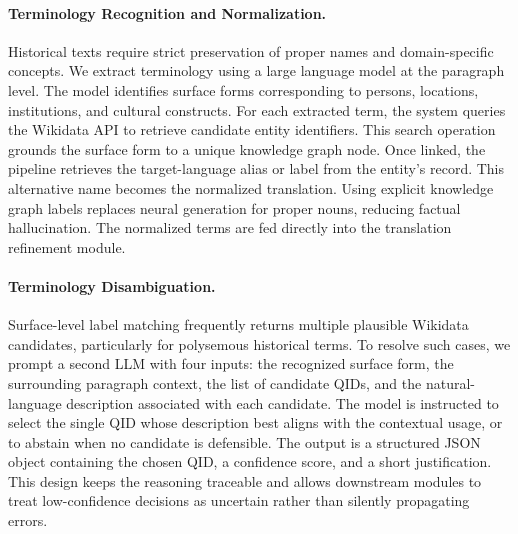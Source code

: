 \documentclass[11pt]{article}
\begin{document}




\paragraph{Terminology Recognition and Normalization.}
Historical texts require strict preservation of proper names and domain-specific concepts. We extract terminology using a large language model at the paragraph level. The model identifies surface forms corresponding to persons, locations, institutions, and cultural constructs. For each extracted term, the system queries the Wikidata API to retrieve candidate entity identifiers. This search operation grounds the surface form to a unique knowledge graph node. Once linked, the pipeline retrieves the target-language alias or label from the entity's record. This alternative name becomes the normalized translation. Using explicit knowledge graph labels replaces neural generation for proper nouns, reducing factual hallucination. The normalized terms are fed directly into the translation refinement module.

\paragraph{Terminology Disambiguation.}
Surface-level label matching frequently returns multiple plausible Wikidata candidates, particularly for polysemous historical terms. To resolve such cases, we prompt a second LLM with four inputs: the recognized surface form, the surrounding paragraph context, the list of candidate QIDs, and the natural-language description associated with each candidate. The model is instructed to select the single QID whose description best aligns with the contextual usage, or to abstain when no candidate is defensible. The output is a structured JSON object containing the chosen QID, a confidence score, and a short justification. This design keeps the reasoning traceable and allows downstream modules to treat low-confidence decisions as uncertain rather than silently propagating errors.
\end{document}
